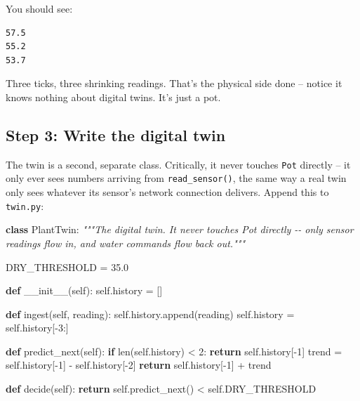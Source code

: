 \documentclass[
  12pt,
  a4paper,
]{article}
\newenvironment{Shaded}{}{}
\newcommand{\BuiltInTok}[1]{\textcolor[rgb]{0.00,0.50,0.00}{#1}}
\newcommand{\CommentTok}[1]{\textcolor[rgb]{0.38,0.63,0.69}{\textit{#1}}}
\newcommand{\ControlFlowTok}[1]{\textcolor[rgb]{0.00,0.44,0.13}{\textbf{#1}}}
\newcommand{\DecValTok}[1]{\textcolor[rgb]{0.25,0.63,0.44}{#1}}
\newcommand{\FloatTok}[1]{\textcolor[rgb]{0.25,0.63,0.44}{#1}}
\newcommand{\FunctionTok}[1]{\textcolor[rgb]{0.02,0.16,0.49}{#1}}
\newcommand{\KeywordTok}[1]{\textcolor[rgb]{0.00,0.44,0.13}{\textbf{#1}}}
\newcommand{\NormalTok}[1]{#1}
\newcommand{\OperatorTok}[1]{\textcolor[rgb]{0.40,0.40,0.40}{#1}}
\newcommand{\VariableTok}[1]{\textcolor[rgb]{0.10,0.09,0.49}{#1}}
\begin{document}
You should see:

\begin{verbatim}
57.5
55.2
53.7
\end{verbatim}

Three ticks, three shrinking readings. That's the physical side done --
notice it knows nothing about digital twins. It's just a pot.

\subsection{Step 3: Write the digital
twin}\label{step-3-write-the-digital-twin}

The twin is a second, separate class. Critically, it never touches
\texttt{Pot} directly -- it only ever sees numbers arriving from
\texttt{read\_}\texttt{sensor()}, the same way a real twin only
sees whatever its sensor's network connection delivers. Append this to
\texttt{twin.py}:

\begin{Shaded}
\begin{Highlighting}[]


\KeywordTok{class}\NormalTok{ PlantTwin:}
    \CommentTok{"""The digital twin. It never touches Pot directly {-}{-} only sensor}
\CommentTok{    readings flow in, and water commands flow back out."""}

\NormalTok{    DRY\_THRESHOLD }\OperatorTok{=} \FloatTok{35.0}

    \KeywordTok{def} \FunctionTok{\_\_init\_\_}\NormalTok{(}\VariableTok{self}\NormalTok{):}
        \VariableTok{self}\NormalTok{.history }\OperatorTok{=}\NormalTok{ []}

    \KeywordTok{def}\NormalTok{ ingest(}\VariableTok{self}\NormalTok{, reading):}
        \VariableTok{self}\NormalTok{.history.append(reading)}
        \VariableTok{self}\NormalTok{.history }\OperatorTok{=} \VariableTok{self}\NormalTok{.history[}\OperatorTok{{-}}\DecValTok{3}\NormalTok{:]}

    \KeywordTok{def}\NormalTok{ predict\_next(}\VariableTok{self}\NormalTok{):}
        \ControlFlowTok{if} \BuiltInTok{len}\NormalTok{(}\VariableTok{self}\NormalTok{.history) }\OperatorTok{\textless{}} \DecValTok{2}\NormalTok{:}
            \ControlFlowTok{return} \VariableTok{self}\NormalTok{.history[}\OperatorTok{{-}}\DecValTok{1}\NormalTok{]}
\NormalTok{        trend }\OperatorTok{=} \VariableTok{self}\NormalTok{.history[}\OperatorTok{{-}}\DecValTok{1}\NormalTok{] }\OperatorTok{{-}} \VariableTok{self}\NormalTok{.history[}\OperatorTok{{-}}\DecValTok{2}\NormalTok{]}
        \ControlFlowTok{return} \VariableTok{self}\NormalTok{.history[}\OperatorTok{{-}}\DecValTok{1}\NormalTok{] }\OperatorTok{+}\NormalTok{ trend}

    \KeywordTok{def}\NormalTok{ decide(}\VariableTok{self}\NormalTok{):}
        \ControlFlowTok{return} \VariableTok{self}\NormalTok{.predict\_next() }\OperatorTok{\textless{}} \VariableTok{self}\NormalTok{.DRY\_THRESHOLD}
\end{Highlighting}
\end{Shaded}
\end{document}
